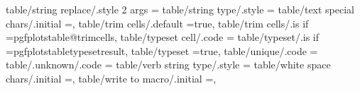 {{{{{{{{{{{{{{{{{{{{{{{{{{{{{{{{{{{{{{{{{{{{{{table/string replace/.style 2 args                                 ={%
table/string type/.style                                           ={%
table/text special chars/.initial                                  =,                                                                                                                                  
table/trim cells/.default                                          =true,                                                                                                                              
table/trim cells/.is if                                            =pgfplotstable@trimcells,                                                                                                           
table/typeset cell/.code                                           ={%
table/typeset/.is if                                               =pgfplotstabletypesetresult,                                                                                                        
table/typeset                                                      =true,                                                                                                                              
table/unique/.code                                                 ={%
table/.unknown/.code                                               ={%
table/verb string type/.style                                      ={%
table/white space chars/.initial                                   =,                                                                                                                                  
table/write to macro/.initial                                      =,                                                                                                                                  
}}}}}}}}}}}}}}}}}}}}}}}}}}}}}}}}}}}}}}}}}}}}}}}}}}}}
